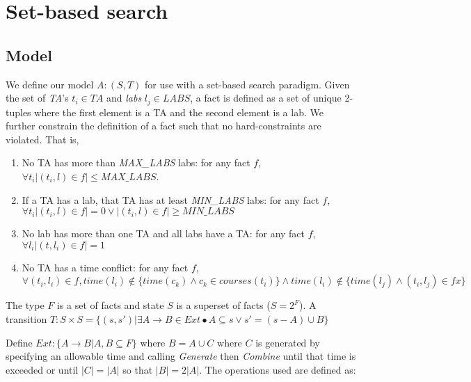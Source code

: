 \documentclass{article}
\begin{document}
\section{Set-based search}

\subsection{Model}


We define our model $A: (S,T)$ for use with a set-based search
paradigm. Given the set of \textit{TA}'s $t_i \in TA$ and
\textit{labs} $l_j \in LABS$, a fact is defined as a set of unique
2-tuples where the first element is a TA and the second element is a
lab. We further constrain the definition of a fact such that no
hard-constraints are violated. That is,

\begin{enumerate}
\item No TA has more than \textit{MAX\_LABS} labs: for any fact $f$,
  $\forall t_i |(t_i,l)\in f|\le MAX\_LABS$.
\item If a TA has a lab, that TA has at least \textit{MIN\_LABS} labs:
  for any fact $f$, $\forall t_i |(t_i,l)\in f|= 0 \lor |(t_i,l)\in
  f|\ge MIN\_LABS$
\item No lab has more than one TA and all labs have a TA: for any fact
  $f$, $\forall l_i |(t, l_i) \in f| = 1$
\item No TA has a time conflict: for any fact $f$, $\forall \left(
  t_i, l_i \right) \in f, time \left( l_i \right) \notin \lbrace time
  \left( c_k \right) \land c_k \in courses \left( t_i \right) \rbrace
  \land time(l_i) \notin \lbrace time(l_j) \land (t_i, l_j) \in f
  x\rbrace $ 

\end{enumerate}

The type $F$ is a set of facts and state $S$ is a superset of facts
($S = 2^F $). A transition $T:S\times S = \lbrace (s,s')| \exists A
\to B \in Ext • A \subseteq s \lor s' =(s-A) \cup B \rbrace$

Define $Ext : \lbrace A \to B | A,B \subseteq F \rbrace$ where $B = A
\cup C$ where $C$ is generated by specifying an allowable time and
calling \textit{Generate} then \textit{Combine} until that time is
exceeded or until $|C| = |A|$ so that $|B| = 2|A|$. The operations
used are defined as:
\end{document}
